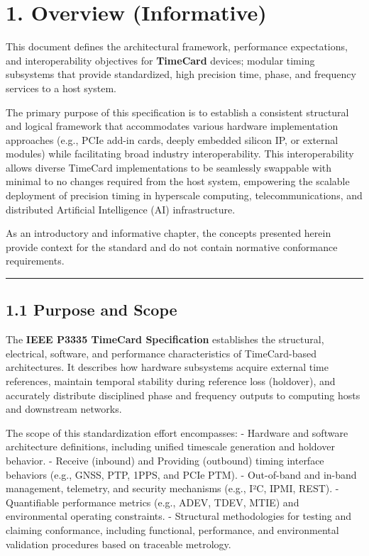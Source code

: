 \section{1. Overview (Informative)}\label{overview-informative}

This document defines the architectural framework, performance
expectations, and interoperability objectives for \textbf{TimeCard}
devices; modular timing subsystems that provide standardized, high
precision time, phase, and frequency services to a host system.

The primary purpose of this specification is to establish a consistent
structural and logical framework that accommodates various hardware
implementation approaches (e.g., PCIe add-in cards, deeply embedded
silicon IP, or external modules) while facilitating broad industry
interoperability. This interoperability allows diverse TimeCard
implementations to be seamlessly swappable with minimal to no changes
required from the host system, empowering the scalable deployment of
precision timing in hyperscale computing, telecommunications, and
distributed Artificial Intelligence (AI) infrastructure.

As an introductory and informative chapter, the concepts presented
herein provide context for the standard and do not contain normative
conformance requirements.

\begin{center}\rule{0.5\linewidth}{0.5pt}\end{center}

\subsection{1.1 Purpose and Scope}\label{purpose-and-scope}

The \textbf{IEEE P3335 TimeCard Specification} establishes the
structural, electrical, software, and performance characteristics of
TimeCard-based architectures. It describes how hardware subsystems
acquire external time references, maintain temporal stability during
reference loss (holdover), and accurately distribute disciplined phase
and frequency outputs to computing hosts and downstream networks.

The scope of this standardization effort encompasses: - Hardware and
software architecture definitions, including unified timescale
generation and holdover behavior. - Receive (inbound) and Providing
(outbound) timing interface behaviors (e.g., GNSS, PTP, 1PPS, and PCIe
PTM). - Out-of-band and in-band management, telemetry, and security
mechanisms (e.g., I²C, IPMI, REST). - Quantifiable performance metrics
(e.g., ADEV, TDEV, MTIE) and environmental operating constraints. -
Structural methodologies for testing and claiming conformance, including
functional, performance, and environmental validation procedures based
on traceable metrology.

